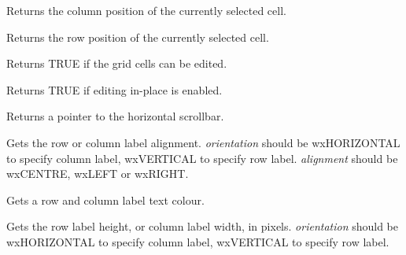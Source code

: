 
Returns the column position of the currently selected cell.

\label{wxgridgetcursorrow}


Returns the row position of the currently selected cell.

\label{wxgridgeteditable}


Returns TRUE if the grid cells can be edited.

\label{wxgridgeteditinplace}


Returns TRUE if editing in-place is enabled.

\label{wxgridgethorizscrollbar}


Returns a pointer to the horizontal scrollbar.

\label{wxgridgetlabelalignment}


Gets the row or column label alignment. {\it orientation} should
be wxHORIZONTAL to specify column label, wxVERTICAL to specify row label.\rtfsp
{\it alignment} should be wxCENTRE, wxLEFT or wxRIGHT.

\label{wxgridgetlabelbackgroundcolour}


Gets a row and column label text colour.

\label{wxgridgetlabelsize}


Gets the row label height, or column label width, in pixels. {\it orientation} should
be wxHORIZONTAL to specify column label, wxVERTICAL to specify row label.

\label{wxgridgetlabeltextcolour}


